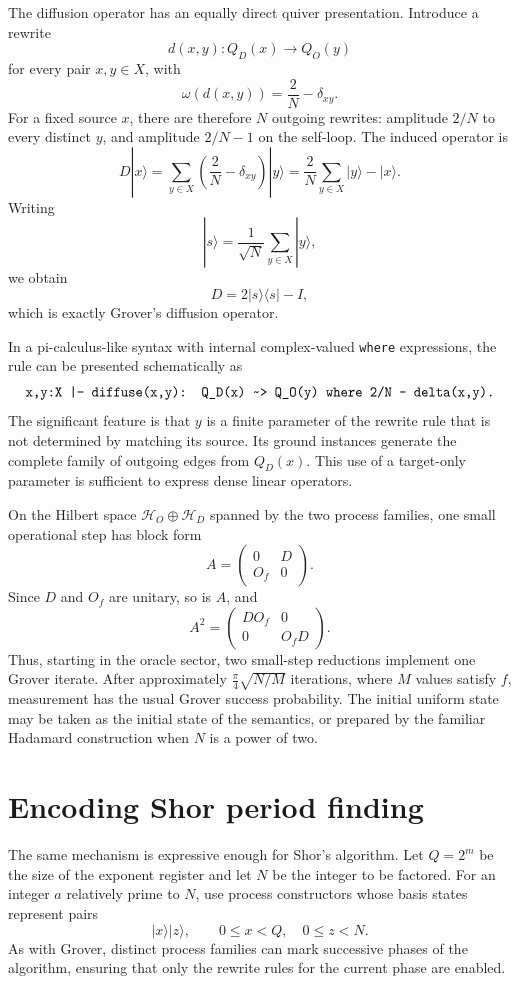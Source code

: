 \documentclass[10pt]{article}
\newcommand{\Hh}{\mathcal{H}}
\begin{document}
The diffusion operator has an equally direct quiver presentation.  Introduce
a rewrite
\[
d(x,y):Q_D(x)\longrightarrow Q_O(y)
\]
for every pair $x,y\in X$, with
\[
\omega(d(x,y))=\frac{2}{N}-\delta_{xy}.
\]
For a fixed source $x$, there are therefore $N$ outgoing rewrites: amplitude
$2/N$ to every distinct $y$, and amplitude $2/N-1$ on the self-loop.  The
induced operator is
\[
D|x\rangle
=
\sum_{y\in X}
\left(\frac{2}{N}-\delta_{xy}\right)|y\rangle
=
\frac{2}{N}\sum_{y\in X}|y\rangle-|x\rangle.
\]
Writing
\[
|s\rangle=\frac{1}{\sqrt N}\sum_{y\in X}|y\rangle,
\]
we obtain
\[
D=2|s\rangle\langle s|-I,
\]
which is exactly Grover's diffusion operator.

In a pi-calculus-like syntax with internal complex-valued \texttt{where}
expressions, the rule can be presented schematically as
\[
\texttt{x,y:X |- diffuse(x,y): Q\_D(x) \string~> Q\_O(y)
        where 2/N - delta(x,y).}
\]
The significant feature is that $y$ is a finite parameter of the rewrite rule
that is not determined by matching its source.  Its ground instances generate
the complete family of outgoing edges from $Q_D(x)$.  This use of a
target-only parameter is sufficient to express dense linear operators.

On the Hilbert space
$\Hh_O\oplus\Hh_D$ spanned by the two process families, one small operational
step has block form
\[
A=
\begin{pmatrix}
0&D\\
O_f&0
\end{pmatrix}.
\]
Since $D$ and $O_f$ are unitary, so is $A$, and
\[
A^2=
\begin{pmatrix}
DO_f&0\\
0&O_fD
\end{pmatrix}.
\]
Thus, starting in the oracle sector, two small-step reductions implement one
Grover iterate.  After approximately
$\frac{\pi}{4}\sqrt{N/M}$ iterations, where $M$ values satisfy $f$, measurement
has the usual Grover success probability.  The initial uniform state may be
taken as the initial state of the semantics, or prepared by the familiar
Hadamard construction when $N$ is a power of two.

\section*{Encoding Shor period finding}

The same mechanism is expressive enough for Shor's algorithm.  Let
$Q=2^m$ be the size of the exponent register and let $N$ be the integer to be
factored.  For an integer $a$ relatively prime to $N$, use process constructors
whose basis states represent pairs
\[
|x\rangle|z\rangle,
\qquad
0\leq x<Q,\quad 0\leq z<N.
\]
As with Grover, distinct process families can mark successive phases of the
algorithm, ensuring that only the rewrite rules for the current phase are
enabled.
\end{document}
